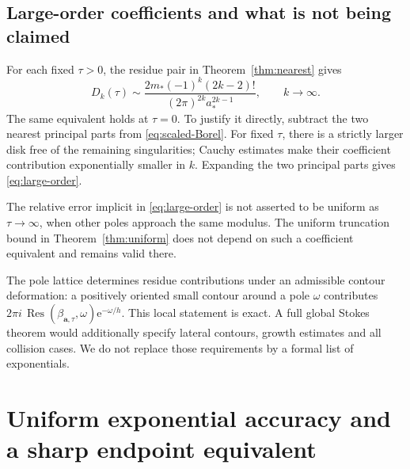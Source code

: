 \documentclass[11pt,a4paper]{article}
\numberwithin{equation}{section}
\theoremstyle{definition}\newtheorem{definition}[theorem]{Definition}
\theoremstyle{remark}\newtheorem{remark}[theorem]{Remark}
\DeclareMathOperator{\Res}{Res}
\newcommand{\e}{\mathrm e}
\newcommand{\avec}{\boldsymbol a}
\newcommand{\amin}{a_*}
\newcommand{\mmin}{m_*}
\begin{document}
\subsection{Large-order coefficients and what is not being claimed}
For each fixed $\tau>0$, the residue pair in Theorem~\ref{thm:nearest} gives
\begin{equation}
 D_k(\tau)\sim
 \frac{2\mmin(-1)^k(2k-2)!}
      {(2\pi)^{2k}\amin^{2k-1}},\qquad k\to\infty.
 \label{eq:large-order}
\end{equation}
The same equivalent holds at $\tau=0$. To justify it directly, subtract the
two nearest principal parts from \eqref{eq:scaled-Borel}. For fixed $\tau$,
there is a strictly larger disk free of the remaining singularities; Cauchy
estimates make their coefficient contribution exponentially smaller in $k$.
Expanding the two principal parts gives \eqref{eq:large-order}.

The relative error implicit in \eqref{eq:large-order} is not asserted to be
uniform as $\tau\to\infty$, when other poles approach the same modulus. The
uniform truncation bound in Theorem~\ref{thm:uniform} does not depend on such
a coefficient equivalent and remains valid there.

The pole lattice determines residue contributions under an admissible
contour deformation: a positively oriented small contour around a pole
$\omega$ contributes
$2\pi i\,\Res(\beta_{\avec,\tau},\omega)\e^{-\omega/h}$.
This local statement is exact. A full global Stokes theorem would additionally
specify lateral contours, growth estimates and all collision cases. We do not
replace those requirements by a formal list of exponentials.

\section{Uniform exponential accuracy and a sharp endpoint equivalent}
\label{sec:optimal}
\end{document}
